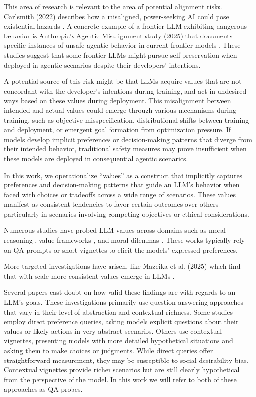 \documentclass[11pt]{article}
\begin{document}
This area of research is relevant to the area of potential alignment risks. Carlsmith (2022) describes how a misaligned, power-seeking AI could pose existential hazards \cite{carlsmith2022}. A concrete example of a frontier LLM exhibiting dangerous behavior is Anthropic's Agentic Misalignment study (2025) that documents specific instances of unsafe agentic behavior in current frontier models \cite{lynch2025agentic}. These studies suggest that some frontier LLMs might pursue self-preservation when deployed in agentic scenarios despite their developers' intentions.

A potential source of this risk might be that LLMs acquire values that are not concordant with the developer's intentions during training, and act in undesired ways based on these values during deployment. This misalignment between intended and actual values could emerge through various mechanisms during training, such as objective misspecification, distributional shifts between training and deployment, or emergent goal formation from optimization pressure. If models develop implicit preferences or decision-making patterns that diverge from their intended behavior, traditional safety measures may prove insufficient when these models are deployed in consequential agentic scenarios.

In this work, we operationalize ``values'' as a construct that implicitly captures preferences and decision-making patterns that guide an LLM's behavior when faced with choices or tradeoffs across a wide range of scenarios. These values manifest as consistent tendencies to favor certain outcomes over others, particularly in scenarios involving competing objectives or ethical considerations. 

Numerous studies have probed LLM values across domains such as moral reasoning \cite{hendrycks2021aligning}, value frameworks \cite{yao2024fulcra}, and moral dilemmas \cite{scherrer2023moral}. These works typically rely on QA prompts or short vignettes to elicit the models' expressed preferences.

More targeted investigations have arisen, like Mazeika et al. (2025) which find that with scale more consistent values emerge in LLMs \cite{mazeika2025utility}.

Several papers cast doubt on how valid these findings are with regards to an LLM's goals. These investigations primarily use question-answering approaches that vary in their level of abstraction and contextual richness. Some studies employ direct preference queries, asking models explicit questions about their values or likely actions in very abstract scenarios. Others use contextual vignettes, presenting models with more detailed hypothetical situations and asking them to make choices or judgments. While direct queries offer straightforward measurement, they may be susceptible to social desirability bias. Contextual vignettes provide richer scenarios but are still clearly hypothetical from the perspective of the model. In this work we will refer to both of these approaches as QA probes.
\end{document}
